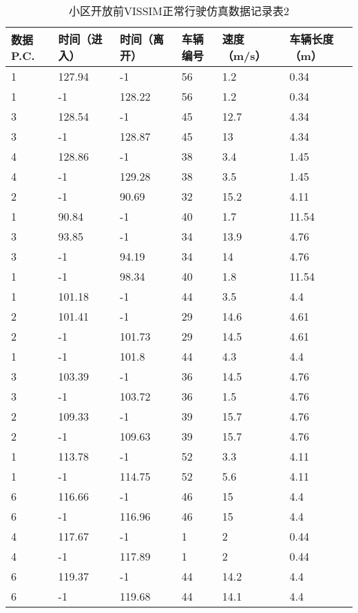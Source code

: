 \begin{table*}[h!]
  \centering
  \small
  \caption{小区开放前VISSIM正常行驶仿真数据记录表2}
  \begin{tabular*}{\linewidth}{p{50pt}<{\centering}p{50pt}<{\centering}
    p{60pt}<{\centering}p{60pt}<{\centering}p{60pt}<{\centering}p{70pt}<{\centering}}
    \toprule
    数据P.C. & 时间（进入） & 时间（离开） & 车辆编号& 速度（m/s） & 车辆长度（m） \\
    \midrule
    1 & 127.94 & -1 & 56 & 1.2 & 0.34 \\
    1 & -1 & 128.22 & 56 & 1.2 & 0.34 \\
    3 & 128.54 & -1 & 45 & 12.7 & 4.34 \\
    3 & -1 & 128.87 & 45 & 13 & 4.34 \\
    4 & 128.86 & -1 & 38 & 3.4 & 1.45 \\
    4 & -1 & 129.28 & 38 & 3.5 & 1.45 \\
    2 & -1 & 90.69 & 32 & 15.2 & 4.11 \\
    1 & 90.84 & -1 & 40 & 1.7 & 11.54 \\
    3 & 93.85 & -1 & 34 & 13.9 & 4.76 \\
    3 & -1 & 94.19 & 34 & 14 & 4.76 \\
    1 & -1 & 98.34 & 40 & 1.8 & 11.54 \\
    1 & 101.18 & -1 & 44 & 3.5 & 4.4 \\
    2 & 101.41 & -1 & 29 & 14.6 & 4.61 \\
    2 & -1 & 101.73 & 29 & 14.5 & 4.61 \\
    1 & -1 & 101.8 & 44 & 4.3 & 4.4 \\
    3 & 103.39 & -1 & 36 & 14.5 & 4.76 \\
    3 & -1 & 103.72 & 36 & 1.5 & 4.76 \\
    2 & 109.33 & -1 & 39 & 15.7 & 4.76 \\
    2 & -1 & 109.63 & 39 & 15.7 & 4.76 \\
    1 & 113.78 & -1 & 52 & 3.3 & 4.11 \\
    1 & -1 & 114.75 & 52 & 5.6 & 4.11 \\
    6 & 116.66 & -1 & 46 & 15 & 4.4 \\
    6 & -1 & 116.96 & 46 & 15 & 4.4 \\
    4 & 117.67 & -1 & 1 & 2 & 0.44 \\
    4 & -1 & 117.89 & 1 & 2 & 0.44 \\
    6 & 119.37 & -1 & 44 & 14.2 & 4.4 \\
    6 & -1 & 119.68 & 44 & 14.1 & 4.4 \\

\end{tabular*}
\end{table*}
